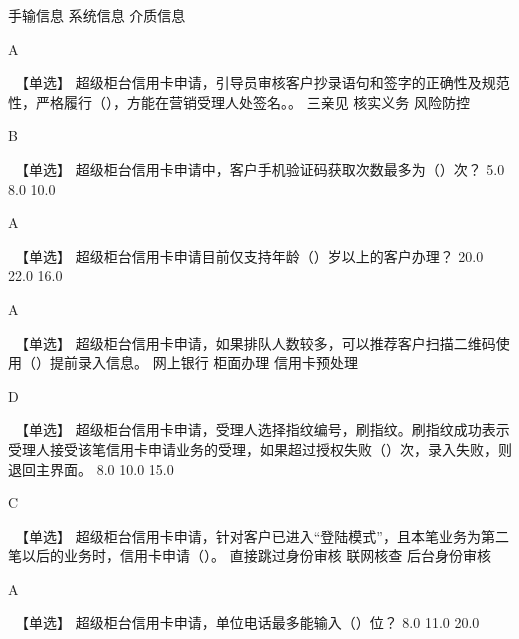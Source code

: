 \documentclass[kindlepaper]{BHCexam4kindle}
\begin{document}
\begin{questions}
 {  手输信息 } { 系统信息 } { 介质信息 }
\begin{solution} A \end{solution}
\qs　【单选】 超级柜台信用卡申请，引导员审核客户抄录语句和签字的正确性及规范性，严格履行（），方能在营销受理人处签名。。 \xx
{} {  三亲见 } { 核实义务 } { 风险防控 }
\begin{solution} B \end{solution}
\qs　【单选】 超级柜台信用卡申请中，客户手机验证码获取次数最多为（）次？ \xx
{} {  5.0 } { 8.0 } { 10.0 }
\begin{solution} A \end{solution}
\qs　【单选】 超级柜台信用卡申请目前仅支持年龄（）岁以上的客户办理？ \xx
{} {  20.0 } { 22.0 } { 16.0 }
\begin{solution} A \end{solution}
\qs　【单选】 超级柜台信用卡申请，如果排队人数较多，可以推荐客户扫描二维码使用（）提前录入信息。 \xx
{} {  网上银行 } { 柜面办理 } { 信用卡预处理 }
\begin{solution} D \end{solution}
\qs　【单选】 超级柜台信用卡申请，受理人选择指纹编号，刷指纹。刷指纹成功表示受理人接受该笔信用卡申请业务的受理，如果超过授权失败（）次，录入失败，则退回主界面。 \xx
{} {  8.0 } { 10.0 } { 15.0 }
\begin{solution} C \end{solution}
\qs　【单选】 超级柜台信用卡申请，针对客户已进入“登陆模式”，且本笔业务为第二笔以后的业务时，信用卡申请（）。 \xx
{} {  直接跳过身份审核 } { 联网核查 } { 后台身份审核 }
\begin{solution} A \end{solution}
\qs　【单选】 超级柜台信用卡申请，单位电话最多能输入（）位？ \xx
{} {  8.0 } { 11.0 } { 20.0 }

\end{questions}
\end{document}
